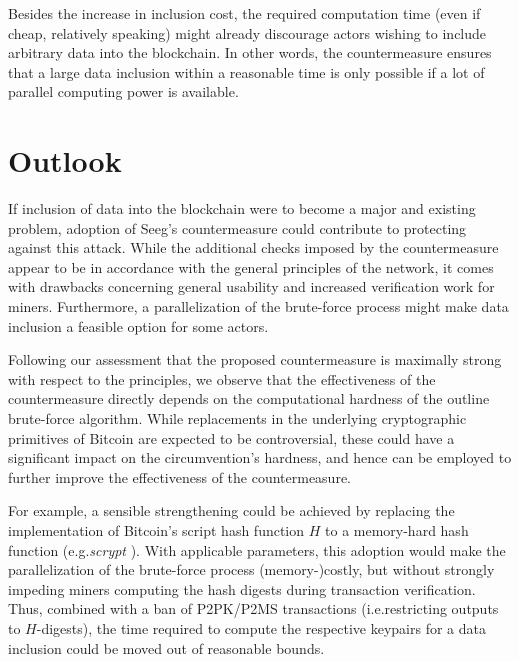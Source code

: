 \documentclass[a4paper,11pt,titlepage]{scrbook}
\begin{document}
Besides the increase in inclusion cost, the required computation time (even if cheap, relatively speaking) might already discourage actors wishing to include arbitrary data into the blockchain.
In other words, the countermeasure ensures that a large data inclusion within a reasonable time is only possible if a lot of parallel computing power is available.

\section{Outlook}

If inclusion of data into the blockchain were to become a major and existing problem, adoption of Seeg's countermeasure could contribute to protecting against this attack.
While the additional checks imposed by the countermeasure appear to be in accordance with the general principles of the network, it comes with drawbacks concerning general usability and increased verification work for miners.
Furthermore, a parallelization of the brute-force process might make data inclusion a feasible option for some actors.

Following our assessment that the proposed countermeasure is maximally strong with respect to the principles, we observe that the effectiveness of the countermeasure directly depends on the computational hardness of the outline brute-force algorithm.
%
While replacements in the underlying cryptographic primitives of Bitcoin are expected to be controversial, 
these could have a significant impact on the circumvention's hardness, and hence can be employed to further improve the effectiveness of the countermeasure.

For example, a sensible strengthening could be achieved by replacing the implementation of Bitcoin's script hash function $H$ to a memory-hard hash function (e.g.\@ \emph{scrypt} \cite{percival_scrypt}).
With applicable parameters, this adoption would make the parallelization of the brute-force process (memory-)costly, but without strongly impeding miners computing the hash digests during transaction verification.
Thus, combined with a ban of P2PK/P2MS transactions (i.e.\@ restricting outputs to $H$-digests), the time required to compute the respective keypairs for a data inclusion could be moved out of reasonable bounds.

\end{document}
